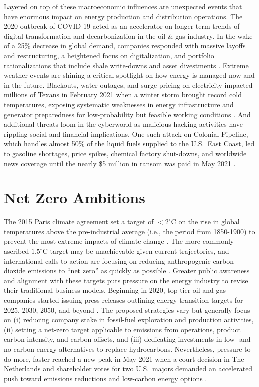 Layered on top of these macroeconomic influences are unexpected events that have enormous impact on energy production and distribution operations. The 2020 outbreak of COVID-19 acted as an accelerator on longer-term trends of digital transformation and decarbonization in the oil \& gas industry. In the wake of a 25\% decrease in global demand, companies responded with massive layoffs and restructuring, a heightened focus on digitalization, and portfolio rationalizations that include shale write-downs and asset divestments \citep{deloitte_2021_2020}. Extreme weather events are shining a critical spotlight on how energy is managed now and in the future. Blackouts, water outages, and surge pricing on electricity impacted millions of Texans in February 2021 when a winter storm brought record cold temperatures, exposing systematic weaknesses in energy infrastructure and generator preparedness for low-probability but feasible working conditions \citep{harc_winter_2021,lazard_lazards_2020}. And additional threats loom in the cyberworld as malicious hacking activities have rippling social and financial implications. One such attack on Colonial Pipeline, which handles almost 50\% of the liquid fuels supplied to the U.S.\ East Coast, led to gasoline shortages, price spikes, chemical factory shut-downs, and worldwide news coverage until the nearly \$5 million in ransom was paid in May 2021 \citep{sanger_pipeline_2021}.

\section{Net Zero Ambitions}\label{ch1:netzero}
The 2015 Paris climate agreement set a target of $<2^\circ$C on the rise in global temperatures above the pre-industrial average (i.e., the period from 1850-1900) to prevent the most extreme impacts of climate change \citep{unfccc_paris_2015}. The more commonly-ascribed $1.5^\circ$C target may be unachievable given current trajectories, and international calls to action are focusing on reducing anthropogenic carbon dioxide emissions to ``net zero'' as quickly as possible \citep{ipcc_global_2018}. Greater public awareness and alignment with these targets puts pressure on the energy industry to revise their traditional business models. Beginning in 2020, top-tier oil and gas companies started issuing press releases outlining energy transition targets for 2025, 2030, 2050, and beyond \citep{bp_international_2020,chevron_chevron_2021,conocophillips_conocophillips_2020,equinor_equinor_2020,exxonmobil_exxonmobil_2021,shell_responsible_2020,shell_shell_2021,total_total_2020,total_2020_2021}. The proposed strategies vary but generally focus on (i) reducing company stake in fossil-fuel exploration and production activities, (ii) setting a net-zero target applicable to emissions from operations, product carbon intensity, and carbon offsets, and (iii) dedicating investments in low- and no-carbon energy alternatives to replace hydrocarbons. Nevertheless, pressure to do more, faster reached a new peak in May 2021 when a court decision in The Netherlands and shareholder votes for two U.S.\ majors demanded an accelerated push toward emissions reductions and low-carbon energy options \citep{mcwilliams_investors_2021}.

